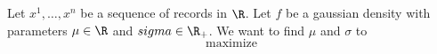 


Let $x^1, \dots, x^n$ be a sequence
of records in $\R$.
Let $f$ be a gaussian density with
parameters $\mu \in \R$ and $sigma \in \R_+$.
We want to find $\mu$ and $\sigma$ to
\[
  \text{maximize}
\]

